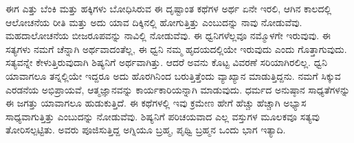 ಈಗ ಎತ್ತು ಬೆಂಕಿ ಮತ್ತು ಹಕ್ಕಿಗಳು ಬೋಧಿಸಿರುವ ಈ ದೃಷ್ಟಾಂತ ಕಥೆಗಳ ಅರ್ಥ ಏನೇ ಇರಲಿ, ಆಗಿನ ಕಾಲದಲ್ಲಿ ಆಲೋಚನೆಯ ರೀತಿ ಮತ್ತು ಅದು ಯಾವ ದಿಕ್ಕಿನಲ್ಲಿ ಹೋಗುತ್ತಿತ್ತು ಎಂಬುದನ್ನು ನಾವು ನೋಡುವೆವು. ಮಹದಾಲೋಚನೆಯ ಬೀಜರೂಪವನ್ನು ನಾವಿಲ್ಲಿ ನೋಡುವೆವು. ಈ ಧ್ವನಿಗಳೆಲ್ಲವೂ ನಮ್ಮೊಳಗೇ ಇರುವುವು. ಈ ಸತ್ಯಗಳು ನಮಗೆ ಚೆನ್ನಾಗಿ ಅರ್ಥವಾದಂತೆಲ್ಲ, ಈ ಧ್ವನಿ ನಮ್ಮ ಹೃದಯದಲ್ಲಿಯೇ ಇರುವುದು ಎಂದು ಗೊತ್ತಾಗುವುದು. ಸತ್ಯವನ್ನೇ ಕೇಳುತ್ತಿರುವುದಾಗಿ ಶಿಷ್ಯನಿಗೆ ಅರ್ಥವಾಗಿತ್ತು. ಆದರೆ ಅವನು ಕೊಟ್ಟ ವಿವರಣೆ ಸರಿಯಾಗಿರಲಿಲ್ಲ. ಧ್ವನಿ ಯಾವಾಗಲೂ ತನ್ನಲ್ಲಿಯೇ ಇದ್ದರೂ ಅದು ಹೊರಗಿನಿಂದ ಬರುತ್ತಿತ್ತೆಂದು ವ್ಯಾಖ್ಯಾನ ಮಾಡುತ್ತಿದ್ದನು. ನಮಗೆ ಸಿಕ್ಕುವ ಎರಡನೆಯ ಅಭಿಪ್ರಾಯವೆ, ಆತ್ಮಜ್ಞಾನವನ್ನು ಕಾರ್ಯಕಾರಿಯನ್ನಾಗಿ ಮಾಡುವುದು. ಧರ್ಮದ ಅನುಷ್ಠಾನ ಸಾಧ್ಯತೆಗಳನ್ನು ಈ ಜಗತ್ತು ಯಾವಾಗಲೂ ಹುಡುಕುತ್ತಿದೆ. ಈ ಕಥೆಗಳಲ್ಲಿ ಇವು ಕ್ರಮೇಣ ಹೇಗೆ ಹೆಚ್ಚು ಹೆಚ್ಚಾಗಿ ಅಭ್ಯಾಸ ಸಾಧ್ಯವಾಗುತ್ತಿತ್ತು ಎಂಬುದನ್ನು ನೋಡುವೆವು. ಶಿಷ್ಯನಿಗೆ ಪರಿಚಯವಾದ ಎಲ್ಲ ವಸ್ತುಗಳ ಮೂಲಕವೂ ಸತ್ಯವು ತೋರಿಸಲ್ಪಟ್ಟಿತು. ಅವರು ಪೂಜಿಸುತ್ತಿದ್ದ ಅಗ್ನಿಯೂ ಬ್ರಹ್ಮ, ಪೃಥ್ವಿ ಬ್ರಹ್ಮನ ಒಂದು ಭಾಗ ಇತ್ಯಾದಿ. 

\vskip 5pt

